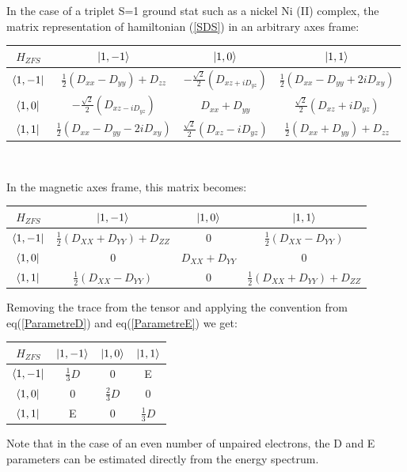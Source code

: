 \documentclass[10pt]{report}
\numberwithin{equation}{section}
\begin{document}
In the case of a triplet S=1 ground stat such as a nickel Ni (II) complex, the matrix representation of hamiltonian (\ref{SDS}) in an arbitrary axes frame:
\begin{center}
    \begin{tabular}{ c | c c c}
        $H_{ZFS}$ & $\ket{1,-1}$ & $\ket{1,0} $& $\ket{1,1}$ \\
        \hline
        $\bra{1,-1} $&  $\frac{1}{2}(D_{xx}-D_{yy})+D_{zz}$ & $-\frac{\sqrt{2}}{2}(D_{xz+iD_{yz}}) $ & $\frac{1}{2}(D_{xx}-D_{yy}+2iD_{xy})$ \\
        $\bra{1,0}$ & $-\frac{\sqrt{2}}{2}(D_{xz-iD_{yz}})  $& $ D_{xx}+D_{yy}  $&$ \frac{\sqrt{2}}{2}(D_{xz}+iD_{yz})$ \\
        $\bra{1,1} $& $ \frac{1}{2}(D_{xx}-D_{yy}-2iD_{xy}) $& $\frac{\sqrt{2}}{2}(D_{xz}-iD_{yz})$  & $\frac{1}{2}(D_{xx}+D_{yy})+D_{zz} $ \\
    \end{tabular}\\
\end{center}
In the magnetic axes frame, this matrix becomes:
\begin{center}
\begin{tabular}{c | c c c}
    $H_{ZFS}$ & $\ket{1,-1}$ & $\ket{1,0} $& $\ket{1,1}$ \\
    \hline
    $\bra{1,-1}$ & $\frac{1}{2}(D_{XX}+D_{YY})+D_{ZZ}$ & 0 & $\frac{1}{2}(D_{XX}-D_{YY})$\\
    $\bra{1,0}$ & 0 & $D_{XX}+D_{YY}$ & 0\\
    $\bra{1,1}$ &  $\frac{1}{2}(D_{XX}-D_{YY})$ & 0 & $\frac{1}{2}(D_{XX}+D_{YY})+D_{ZZ}$
\end{tabular}
\end{center}
Removing the trace from the tensor and applying the convention from eq(\ref{ParametreD}) and eq(\ref{ParametreE}) we get:
\begin{center}
\begin{tabular}{c | c c c}
    $H_{ZFS}$ & $\ket{1,-1}$ & $\ket{1,0}$ & $\ket{1,1}$\\
    \hline
    $\bra{1,-1}$ & $\frac{1}{3}D$ & 0 & E\\
    $\bra{1,0}$ & 0 & $\frac{2}{3}D $& 0\\
    $\bra{1,1}$ & E & 0 & $\frac{1}{3}D$
\end{tabular}
\end{center}
Note that in the case of an even number of unpaired electrons, the D and E parameters can be estimated directly from the energy spectrum.
\end{document}
